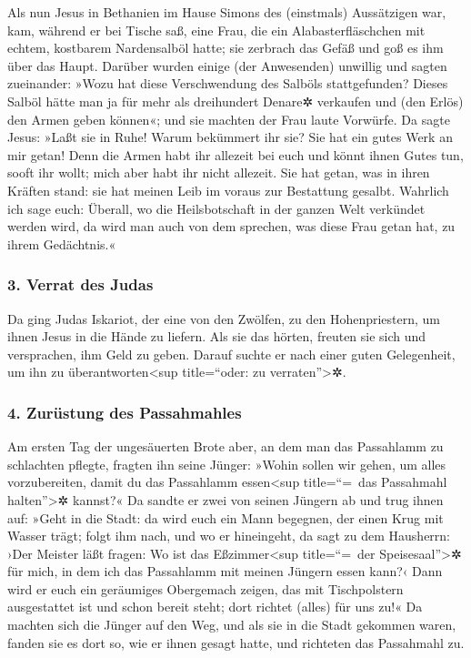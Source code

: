  Als nun Jesus in Bethanien im Hause Simons des
(einstmals) Aussätzigen war, kam, während er bei Tische saß, eine Frau,
die ein Alabasterfläschchen mit echtem, kostbarem Nardensalböl hatte;
sie zerbrach das Gefäß und goß es ihm über das Haupt. 
Darüber wurden einige (der Anwesenden) unwillig und sagten zueinander:
»Wozu hat diese Verschwendung des Salböls stattgefunden? 
Dieses Salböl hätte man ja für mehr als dreihundert Denare✲ verkaufen
und (den Erlös) den Armen geben können«; und sie machten der Frau laute
Vorwürfe.  Da sagte Jesus: »Laßt sie in Ruhe! Warum
bekümmert ihr sie? Sie hat ein gutes Werk an mir getan! 
Denn die Armen habt ihr allezeit bei euch und könnt ihnen Gutes tun,
sooft ihr wollt; mich aber habt ihr nicht allezeit.  Sie
hat getan, was in ihren Kräften stand: sie hat meinen Leib im voraus zur
Bestattung gesalbt.  Wahrlich ich sage euch: Überall, wo
die Heilsbotschaft in der ganzen Welt verkündet werden wird, da wird man
auch von dem sprechen, was diese Frau getan hat, zu ihrem Gedächtnis.«

\hypertarget{verrat-des-judas}{%
\subsubsection{3. Verrat des Judas}\label{verrat-des-judas}}

 Da ging Judas Iskariot, der eine von den Zwölfen, zu den
Hohenpriestern, um ihnen Jesus in die Hände zu liefern. 
Als sie das hörten, freuten sie sich und versprachen, ihm Geld zu geben.
Darauf suchte er nach einer guten Gelegenheit, um ihn zu
überantworten\textless sup title=``oder: zu verraten''\textgreater✲.

\hypertarget{zuruxfcstung-des-passahmahles}{%
\subsubsection{4. Zurüstung des
Passahmahles}\label{zuruxfcstung-des-passahmahles}}

 Am ersten Tag der ungesäuerten Brote aber, an dem man
das Passahlamm zu schlachten pflegte, fragten ihn seine Jünger: »Wohin
sollen wir gehen, um alles vorzubereiten, damit du das Passahlamm
essen\textless sup title=``=~das Passahmahl halten''\textgreater✲
kannst?«  Da sandte er zwei von seinen Jüngern ab und
trug ihnen auf: »Geht in die Stadt: da wird euch ein Mann begegnen, der
einen Krug mit Wasser trägt; folgt ihm nach,  und wo er
hineingeht, da sagt zu dem Hausherrn: ›Der Meister läßt fragen: Wo ist
das Eßzimmer\textless sup title=``=~der Speisesaal''\textgreater✲ für
mich, in dem ich das Passahlamm mit meinen Jüngern essen kann?‹
 Dann wird er euch ein geräumiges Obergemach zeigen, das
mit Tischpolstern ausgestattet ist und schon bereit steht; dort richtet
(alles) für uns zu!«  Da machten sich die Jünger auf den
Weg, und als sie in die Stadt gekommen waren, fanden sie es dort so, wie
er ihnen gesagt hatte, und richteten das Passahmahl zu.

